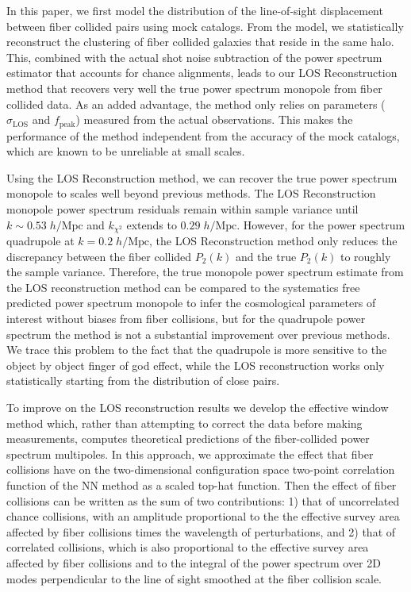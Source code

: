 In this paper, we first model the distribution of the line-of-sight displacement between 
fiber collided pairs using  mock catalogs. From the model, we statistically reconstruct the 
clustering of fiber collided galaxies that reside in the same halo. This, combined with the actual shot noise subtraction   
of the power spectrum estimator that accounts for chance alignments, 
leads to our LOS Reconstruction method that recovers very well the true power 
spectrum monopole from fiber collided data. As an added advantage, the method 
only relies on parameters ($\sigma_\mathrm{LOS}$ and $f_\mathrm{peak}$) 
measured from the actual observations. This makes the performance of the method 
independent from the accuracy of the mock catalogs, which are known to be unreliable 
at small scales. 

Using the LOS Reconstruction method, we can recover the true power 
spectrum monopole to scales well beyond previous methods. The LOS Reconstruction monopole power spectrum residuals remain within sample 
variance until $k \sim 0.53\;h/\mathrm{Mpc}$ and $k_{\chi^2}$ extends to  
$0.29\;h/\mathrm{Mpc}$. However, for the power spectrum quadrupole
at $k = 0.2\;h/\mathrm{Mpc}$,
the LOS Reconstruction method only reduces the discrepancy between the 
fiber collided $P_2(k)$ and the true $P_2(k)$ to roughly the sample variance. 
Therefore, the true monopole power spectrum estimate from 
the LOS reconstruction method can be compared to the systematics free predicted  
power spectrum monopole to infer the cosmological parameters of interest without 
biases from fiber collisions, but for the quadrupole power spectrum the method is not a substantial improvement over previous methods. We trace this problem  to the fact that the quadrupole is more sensitive to the object by object finger of god effect, while the LOS reconstruction works only statistically starting from the distribution of close pairs. 

To improve on the LOS reconstruction results we develop the effective window method which, rather than attempting to correct the data before making measurements, computes theoretical predictions of the fiber-collided power spectrum multipoles.
In this approach, we approximate the effect that 
fiber collisions have on the two-dimensional configuration space two-point 
correlation function of the NN method as a scaled top-hat function. 
Then the effect of fiber collisions can be written as the sum of two contributions: 1) that of uncorrelated chance collisions, with an amplitude proportional to the 
the effective survey area affected by fiber collisions times the wavelength of perturbations, and 2) that of correlated collisions, which is also proportional to the effective survey area affected by fiber collisions and to the integral of the power spectrum over 2D modes perpendicular to the line of sight smoothed at the fiber collision scale.

